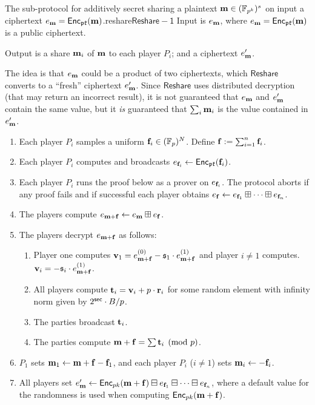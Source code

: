 \begin{Boxfig}{The sub-protocol for additively secret sharing a plaintext $\mathbf{m} \in ({\mathbb{F}}_{p^k})^s$ on input a ciphertext $e_{\mathbf{m}}=\mathsf{Enc}_{\mathfrak{pk}}(\mathbf{m})$.}{reshare}{$\mathsf{Reshare-1}$}
Input is $e_{\mathbf{m}}$, where $e_{\mathbf{m}}=\mathsf{Enc}_{\mathfrak{pk}}(\mathbf{m})$ is a public ciphertext.

Output is a share $\mathbf{m}_i$ of $\mathbf{m}$ to each player $P_i$; and a ciphertext $e'_{\mathbf{m}}$. 

The idea is that $e_{\mathbf{m}}$ could be a product of two ciphertexts, which
$\mathsf{Reshare}$ converts to a ``fresh'' ciphertext $e'_{\mathbf{m}}$. Since $\mathsf{Reshare}$ uses distributed decryption (that may return an incorrect result), it is not guaranteed that $e_{\mathbf{m}}$ and $e'_{\mathbf{m}}$ contain the same value, but it
{\em is} guaranteed that $\sum_i \mathbf{m}_i$ is the value contained in $e'_{\mathbf{m}}$.
\begin{enumerate}
\item Each player $P_i$ samples a uniform $\mathbf{f}_i\in ({\mathbb{F}}_p)^N$. Define $\mathbf{f}:=\sum_{i=1}^{n}\mathbf{f}_i$.
\item Each player $P_i$ computes and broadcasts $e_{\mathbf{f}_i}\leftarrow\mathsf{Enc}_{\mathfrak{pk}}(\mathbf{f}_i)$.\label{reshare:enc}
\item Each player $P_i$ runs the proof below as a prover on $e_{\mathbf{f}_i}$. The protocol aborts if any proof fails
and if successful each player obtains $e_{\mathbf{f}}\leftarrow e_{\mathbf{f}_1}\boxplus\dots\boxplus e_{\mathbf{f}_n}$.
\item The players compute $e_{\mathbf{m}+\mathbf{f}}\leftarrow e_{\mathbf{m}}\boxplus e_{\mathbf{f}}$.
\item The players decrypt $e_{\mathbf{m}+\mathbf{f}}$ as follows:
\begin{enumerate}
\item Player one computes $\mathbf{v}_1 = e_{\mathbf{m}+\mathbf{f}}^{(0)}-\mathfrak{s}_1 \cdot e_{\mathbf{m}+\mathbf{f}}^{(1)}$ and player $i \ne 1$ computes.
$\mathbf{v}_i = -\mathfrak{s}_i \cdot e_{\mathbf{m}+\mathbf{f}}^{(1)}$.
\item All players compute $\mathbf{t}_i = \mathbf{v}_i + p \cdot \mathbf{r}_i$ for some random element
with infinity norm given by $2^{\mathsf{sec}} \cdot B/p$.
\item The parties broadcast $\mathbf{t}_i$.
\item The parties compute $\mathbf{m}+\mathbf{f} = \sum \mathbf{t}_i \pmod{p}$.
\end{enumerate}
\item $P_1$ sets $\mathbf{m}_1\leftarrow \mathbf{m}+\mathbf{f}-\mathbf{f}_1$, and
each player $P_i$ ($i\neq 1$) sets $\mathbf{m}_i\leftarrow -\mathbf{f}_i$.
\item All players set $e'_{\mathbf{m}} \leftarrow \mathsf{Enc}_{pk}(\mathbf{m}+\mathbf{f})\boxminus e_{\mathbf{f}_1} \boxminus \dots \boxminus e_{\mathbf{f}_n}$,
where a default value for the randomness is used when computing $\mathsf{Enc}_{pk}(\mathbf{m}+\mathbf{f})$.
\end{enumerate}
\end{Boxfig}



